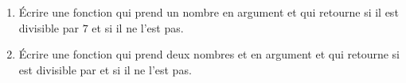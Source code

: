 
\begin{exercice}\label{exoPremiere-0067}

    \begin{enumerate}
        \item
    Écrire une fonction qui prend un nombre  en argument et qui retourne  si il est divisible par \( 7\) et  si il ne l'est pas.
    \item

        Écrire une fonction qui prend deux nombres  et  en argument et qui retourne  si   est divisible par  et  si il ne l'est pas.

    \end{enumerate}

\end{exercice}
